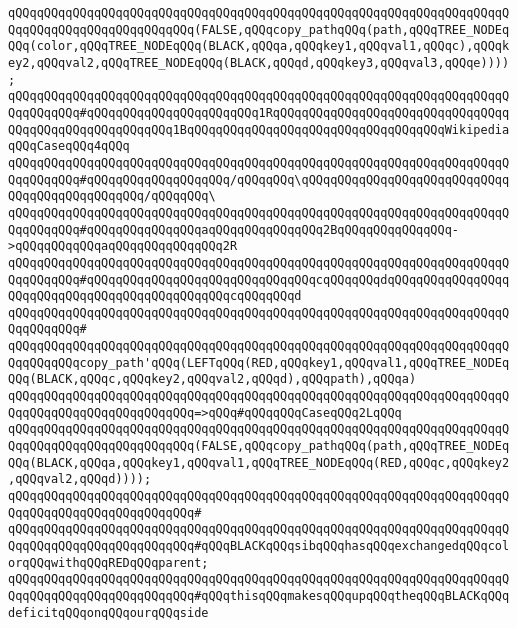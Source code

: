 \verb|qQQqqQQqqQQqqQQqqQQqqQQqqQQqqQQqqQQqqQQqqQQqqQQqqQQqqQQqqQQqqQQqqQQqqQQqqQQqqQQqqQQqqQQqqQQqqQQq(FALSE,qQQqcopy_pathqQQq(path,qQQqTREE_NODEqQQq(color,qQQqTREE_NODEqQQq(BLACK,qQQqa,qQQqkey1,qQQqval1,qQQqc),qQQqkey2,qQQqval2,qQQqTREE_NODEqQQq(BLACK,qQQqd,qQQqkey3,qQQqval3,qQQqe))));|\newline
\newline
\verb|qQQqqQQqqQQqqQQqqQQqqQQqqQQqqQQqqQQqqQQqqQQqqQQqqQQqqQQqqQQqqQQqqQQqqQQqqQQqqQQq#qQQqqQQqqQQqqQQqqQQqqQQq1RqQQqqQQqqQQqqQQqqQQqqQQqqQQqqQQqqQQqqQQqqQQqqQQqqQQqqQQq1BqQQqqQQqqQQqqQQqqQQqqQQqqQQqqQQqqQQqWikipediaqQQqCaseqQQq4qQQq|\newline
\verb|qQQqqQQqqQQqqQQqqQQqqQQqqQQqqQQqqQQqqQQqqQQqqQQqqQQqqQQqqQQqqQQqqQQqqQQqqQQqqQQq#qQQqqQQqqQQqqQQqqQQq/qQQqqQQq\qQQqqQQqqQQqqQQqqQQqqQQqqQQqqQQqqQQqqQQqqQQqqQQq/qQQqqQQq\|\newline
\verb|qQQqqQQqqQQqqQQqqQQqqQQqqQQqqQQqqQQqqQQqqQQqqQQqqQQqqQQqqQQqqQQqqQQqqQQqqQQqqQQq#qQQqqQQqqQQqqQQqaqQQqqQQqqQQqqQQq2BqQQqqQQqqQQqqQQq->qQQqqQQqqQQqaqQQqqQQqqQQqqQQq2R|\newline
\verb|qQQqqQQqqQQqqQQqqQQqqQQqqQQqqQQqqQQqqQQqqQQqqQQqqQQqqQQqqQQqqQQqqQQqqQQqqQQqqQQq#qQQqqQQqqQQqqQQqqQQqqQQqqQQqqQQqcqQQqqQQqdqQQqqQQqqQQqqQQqqQQqqQQqqQQqqQQqqQQqqQQqqQQqqQQqcqQQqqQQqd|\newline
\verb|qQQqqQQqqQQqqQQqqQQqqQQqqQQqqQQqqQQqqQQqqQQqqQQqqQQqqQQqqQQqqQQqqQQqqQQqqQQqqQQq#|\newline
\verb|qQQqqQQqqQQqqQQqqQQqqQQqqQQqqQQqqQQqqQQqqQQqqQQqqQQqqQQqqQQqqQQqqQQqqQQqqQQqqQQqcopy_path'qQQq(LEFTqQQq(RED,qQQqkey1,qQQqval1,qQQqTREE_NODEqQQq(BLACK,qQQqc,qQQqkey2,qQQqval2,qQQqd),qQQqpath),qQQqa)|\newline
\verb|qQQqqQQqqQQqqQQqqQQqqQQqqQQqqQQqqQQqqQQqqQQqqQQqqQQqqQQqqQQqqQQqqQQqqQQqqQQqqQQqqQQqqQQqqQQqqQQq=>qQQq#qQQqqQQqCaseqQQq2LqQQq|\newline
\verb|qQQqqQQqqQQqqQQqqQQqqQQqqQQqqQQqqQQqqQQqqQQqqQQqqQQqqQQqqQQqqQQqqQQqqQQqqQQqqQQqqQQqqQQqqQQqqQQq(FALSE,qQQqcopy_pathqQQq(path,qQQqTREE_NODEqQQq(BLACK,qQQqa,qQQqkey1,qQQqval1,qQQqTREE_NODEqQQq(RED,qQQqc,qQQqkey2,qQQqval2,qQQqd))));|\newline
\verb|qQQqqQQqqQQqqQQqqQQqqQQqqQQqqQQqqQQqqQQqqQQqqQQqqQQqqQQqqQQqqQQqqQQqqQQqqQQqqQQqqQQqqQQqqQQqqQQq#|\newline
\verb|qQQqqQQqqQQqqQQqqQQqqQQqqQQqqQQqqQQqqQQqqQQqqQQqqQQqqQQqqQQqqQQqqQQqqQQqqQQqqQQqqQQqqQQqqQQqqQQq#qQQqBLACKqQQqsibqQQqhasqQQqexchangedqQQqcolorqQQqwithqQQqREDqQQqparent;|\newline
\verb|qQQqqQQqqQQqqQQqqQQqqQQqqQQqqQQqqQQqqQQqqQQqqQQqqQQqqQQqqQQqqQQqqQQqqQQqqQQqqQQqqQQqqQQqqQQqqQQq#qQQqthisqQQqmakesqQQqupqQQqtheqQQqBLACKqQQqdeficitqQQqonqQQqourqQQqside|\newline

